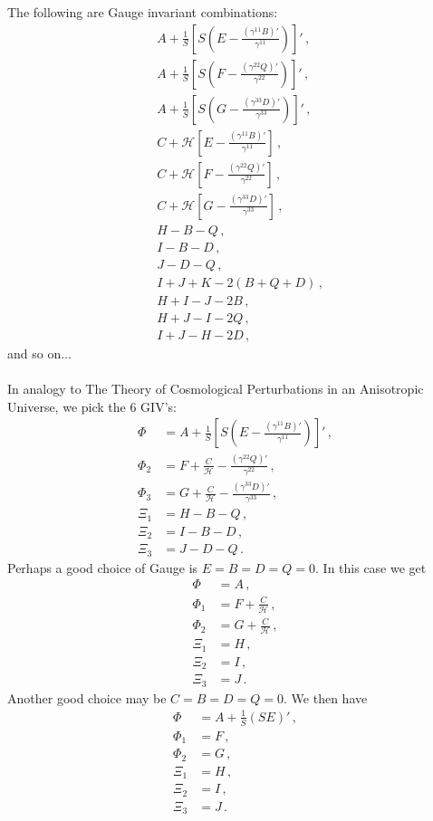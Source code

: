 \documentclass{article}
\newcommand*\scr[1]{\mathscr{#1}}
\newcommand*\p[1]{\left(#1\right)}
\newcommand*\ps[1]{\left[#1\right]}
\newcommand*\f[2]{\frac{#1}{#2}}
\begin{document}
The following are Gauge invariant combinations:
\begin{align}
&A+\f1S\ps{S\p{E-\f{(\gamma^{11} B)'}{\gamma^{11}}}}'\,,\\
&A+\f1S\ps{S\p{F-\f{(\gamma^{22} Q)'}{\gamma^{22}}}}'\,,\\
&A+\f1S\ps{S\p{G-\f{(\gamma^{33} D)'}{\gamma^{33}}}}'\,,\\
&C+\scr H\ps{E-\f{(\gamma^{11}B)'}{\gamma^{11}}}\,,\\
&C+\scr H\ps{F-\f{(\gamma^{22}Q)'}{\gamma^{22}}}\,,\\
&C+\scr H\ps{G-\f{(\gamma^{33}D)'}{\gamma^{33}}}\,,\\
&H-B-Q\,,\\
&I-B-D\,,\\
&J-D-Q\,,\\
&I+J+K-2(B+Q+D)\,,\\
&H+I-J-2B\,,\\
&H+J-I-2Q\,,\\
&I+J-H-2D\,,
\end{align}
and so on...
\\\\
In analogy to The Theory of Cosmological Perturbations in an Anisotropic Universe, we pick the 6 GIV's:
\begin{align}
\Phi&=A+\f1S\ps{S\p{E-\f{(\gamma^{11} B)'}{\gamma^{11}}}}'\,,\\
\Phi_2&=F+\f{C}{\scr H}-\f{(\gamma^{22}Q)'}{\gamma^{22}}\,,\\
\Phi_3&=G+\f{C}{\scr H}-\f{(\gamma^{33}D)'}{\gamma^{33}}\,,\\
\Xi_1&=H-B-Q\,,\\
\Xi_2&=I-B-D\,,\\
\Xi_3&=J-D-Q\,.
\end{align}
Perhaps a good choice of Gauge is $E=B=D=Q=0$. In this case we get
\begin{align}
\Phi&=A\,,\\
\Phi_1&=F+\f{C}{\scr H}\,,\\
\Phi_2&=G+\f{C}{\scr H}\,,\\
\Xi_1&=H\,,\\
\Xi_2&=I\,,\\
\Xi_3&=J\,.
\end{align}
Another good choice may be $C=B=D=Q=0$. We then have
\begin{align}
\Phi&=A+\f1S\p{SE}'\,,\\
\Phi_1&=F\,,\\
\Phi_2&=G\,,\\
\Xi_1&=H\,,\\
\Xi_2&=I\,,\\
\Xi_3&=J\,.
\end{align}
\end{document}
